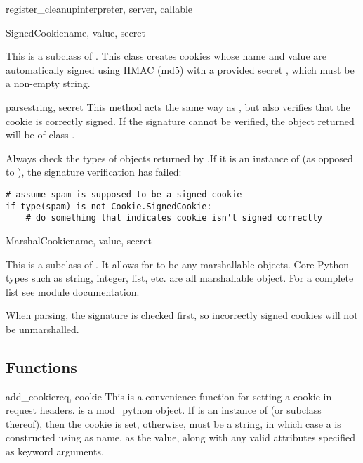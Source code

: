 \begin{funcdesc}{register_cleanup}{interpreter, server, callable}
\begin{classdesc}{SignedCookie}{name, value, secret}

  This is a subclass of . This class creates cookies
  whose name and value are automatically signed using HMAC (md5) with
  a provided secret , which must be a non-empty string.

  \begin{methoddesc}[SignedCookie]{parse}{string, secret}
    This method acts the same way as , but also
    verifies that the cookie is correctly signed. If the signature
    cannot be verified, the object returned will be of class
    .

    \begin{notice}
      Always check the types of objects returned by
      .If it is an instance of
       (as opposed to ), the
      signature verification has failed:
      \begin{verbatim}
# assume spam is supposed to be a signed cookie
if type(spam) is not Cookie.SignedCookie:
    # do something that indicates cookie isn't signed correctly
      \end{verbatim}
    \end{notice}
  \end{methoddesc}

\end{classdesc}

\begin{classdesc}{MarshalCookie}{name, value, secret}

  This is a subclass of . It allows for
   to be any marshallable objects. Core Python types such as
  string, integer, list, etc. are all marshallable object. For a
  complete list see
  module documentation.

  When parsing, the signature is checked first, so incorrectly signed cookies
  will not be unmarshalled.

\end{classdesc}

\subsection{Functions\label{pyapi-cookie-func}}

\begin{funcdesc}{add_cookie}{req, cookie}
  This is a convenience function for setting a cookie in request
  headers.  is a mod_python  object.  If
   is an instance of  (or subclass thereof),
  then the cookie is set, otherwise,  must be a string, in
  which case a  is constructed using  as
  name,  as the value, along with any valid 
  attributes specified as keyword arguments.


\end{funcdesc}
\end{funcdesc}
